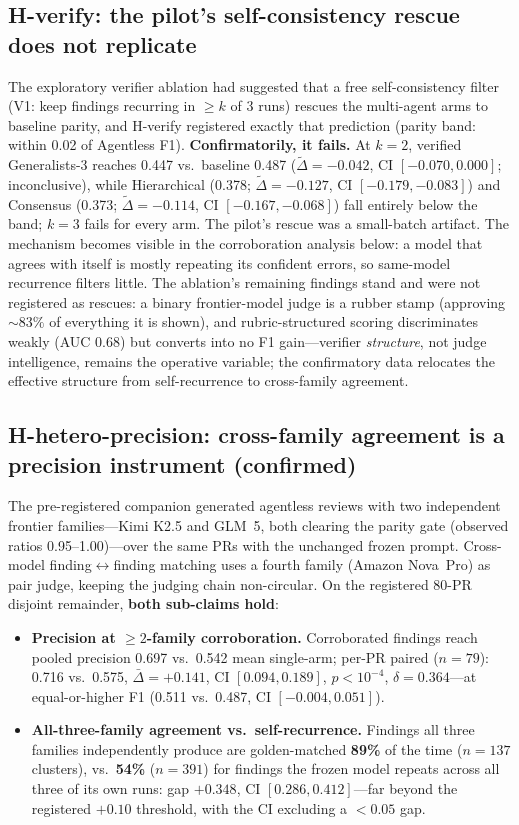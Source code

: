 \documentclass[conference]{IEEEtran}
\begin{document}
\subsection{H-verify: the pilot's self-consistency rescue does not
replicate}
\label{sec:hverify}
The exploratory verifier ablation had suggested that a free
self-consistency filter (V1: keep findings recurring in ${\geq}k$ of 3
runs) rescues the multi-agent arms to baseline parity, and H-verify
registered exactly that prediction (parity band: within 0.02 of Agentless
F1). \textbf{Confirmatorily, it fails.} At $k{=}2$, verified Generalists-3
reaches 0.447 vs.\ baseline 0.487 ($\tilde\Delta{=}{-}0.042$, CI
$[-0.070, 0.000]$; inconclusive), while Hierarchical (0.378;
$\tilde\Delta{=}{-}0.127$, CI $[-0.179, -0.083]$) and Consensus (0.373;
$\tilde\Delta{=}{-}0.114$, CI $[-0.167, -0.068]$) fall entirely below the
band; $k{=}3$ fails for every arm. The pilot's rescue was a small-batch
artifact. The mechanism becomes visible in the corroboration analysis
below: a model that agrees with itself is mostly repeating its confident
errors, so same-model recurrence filters little. The ablation's remaining
findings stand and were not registered as rescues: a binary frontier-model
judge is a rubber stamp (approving ${\sim}83\%$ of everything it is
shown), and rubric-structured scoring discriminates weakly (AUC 0.68) but
converts into no F1 gain---verifier \emph{structure}, not judge
intelligence, remains the operative variable; the confirmatory data
relocates the effective structure from self-recurrence to cross-family
agreement.

\subsection{H-hetero-precision: cross-family agreement is a precision
instrument (confirmed)}
\label{sec:hetero}
The pre-registered companion generated agentless reviews with two
independent frontier families---Kimi K2.5 and GLM~5, both clearing the
parity gate (observed ratios 0.95--1.00)---over the same PRs with the
unchanged frozen prompt. Cross-model finding$\leftrightarrow$finding
matching uses a fourth family (Amazon Nova~Pro) as pair judge, keeping the
judging chain non-circular. On the registered 80-PR disjoint remainder,
\textbf{both sub-claims hold}:

\begin{itemize}
\item \textbf{Precision at ${\geq}2$-family corroboration.} Corroborated
findings reach pooled precision 0.697 vs.\ 0.542 mean single-arm; per-PR
paired ($n{=}79$): 0.716 vs.\ 0.575, $\bar\Delta{=}{+}0.141$, CI
$[0.094, 0.189]$, $p{<}10^{-4}$, $\delta{=}0.364$---at equal-or-higher F1
(0.511 vs.\ 0.487, CI $[-0.004, 0.051]$).
\item \textbf{All-three-family agreement vs.\ self-recurrence.} Findings
all three families independently produce are golden-matched \textbf{89\%}
of the time ($n{=}137$ clusters), vs.\ \textbf{54\%} ($n{=}391$) for
findings the frozen model repeats across all three of its own runs: gap
${+}0.348$, CI $[0.286, 0.412]$---far beyond the registered ${+}0.10$
threshold, with the CI excluding a ${<}0.05$ gap.
\end{itemize}
\end{document}
